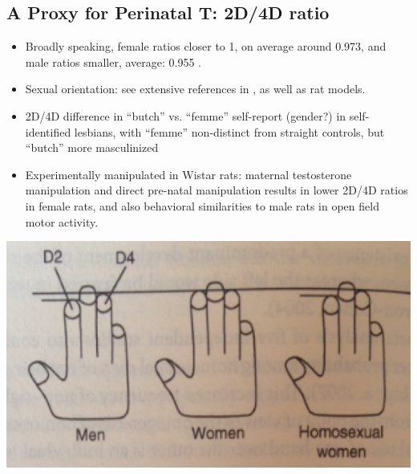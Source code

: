 \documentclass[a0,portrait]{a0poster}
\begin{document}
\begin{multicols}{2}
\subsection*{A Proxy for Perinatal T: 2D/4D ratio}






\begin{multicols}{2}

\begin{itemize}
	\item Broadly speaking, female ratios closer to 1, on average around 0.973, and male ratios smaller, average: 0.955 \citep[][107]{balthazart2011}.
	
	\item Sexual orientation: see extensive references in \citet{balthazart2011}, as well as rat models.
	\item 2D/4D difference in ``butch'' vs. ``femme'' self-report (gender?) in self-identified lesbians, with ``femme'' non-distinct from straight controls, but ``butch'' more masculinized \citep{brownetal2002}
	\item Experimentally manipulated in Wistar rats: maternal testosterone manipulation and direct pre-natal manipulation results in lower 2D/4D ratios in female rats, and also behavioral similarities to male rats in open field motor activity\citep{talarovicovaetal2009}.
\end{itemize}

\begin{center}
  \includegraphics[width=0.5\linewidth]{balthazart108hands.png}
  \end{center}
\end{multicols}


\end{multicols}
\end{document}

